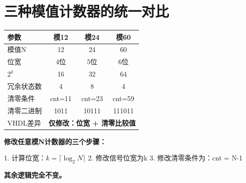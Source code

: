 \section{三种模值计数器的统一对比}

\begin{center}
\begin{tabular}{|l|c|c|c|}
\hline
\textbf{参数} & \textbf{模12} & \textbf{模24} & \textbf{模60} \\
\hline
模值N & 12 & 24 & 60 \\
位宽 & 4位 & 5位 & 6位 \\
$2^k$ & 16 & 32 & 64 \\
冗余状态数 & 4 & 8 & 4 \\
清零条件 & cnt=11 & cnt=23 & cnt=59 \\
清零二进制 & 1011 & 10111 & 111011 \\
\hline
VHDL差异 & \multicolumn{3}{c|}{\textbf{仅修改：位宽 + 清零比较值}} \\
\hline
\end{tabular}
\end{center}

\begin{keypoint}[所有二进制计数器的统一模板]
\textbf{修改任意模N计数器的三个步骤：}

1. 计算位宽：$k = \lceil \log_2 N \rceil$
2. 修改信号位宽为k
3. 修改清零条件为：cnt = N-1

\textbf{其余逻辑完全不变。}
\end{keypoint}
